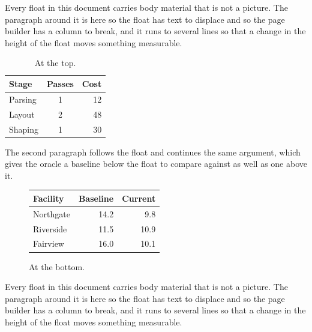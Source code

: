\documentclass{article}
\begin{document}
Every float in this document carries body material that is not a
picture. The paragraph around it is here so the float has text to displace and
so the page builder has a column to break, and it runs to several lines so that
a change in the height of the float moves something measurable.

\begin{table}[t]
\centering
\begin{tabular}{|l|c|r|}
\hline
Stage & Passes & Cost \\
\hline
Parsing & 1 & 12 \\
Layout & 2 & 48 \\
Shaping & 1 & 30 \\
\hline
\end{tabular}
\caption{At the top.}
\end{table}

The second paragraph follows the float and continues the same
argument, which gives the oracle a baseline below the float to compare against
as well as one above it.

\begin{figure}[b]
\centering
\begin{tabular}{@{}lrr@{}}
\toprule
Facility & Baseline & Current \\
\midrule
Northgate & 14.2 & 9.8 \\
Riverside & 11.5 & 10.9 \\
Fairview & 16.0 & 10.1 \\
\bottomrule
\end{tabular}
\caption{At the bottom.}
\end{figure}

Every float in this document carries body material that is not a
picture. The paragraph around it is here so the float has text to displace and
so the page builder has a column to break, and it runs to several lines so that
a change in the height of the float moves something measurable.
\end{document}
